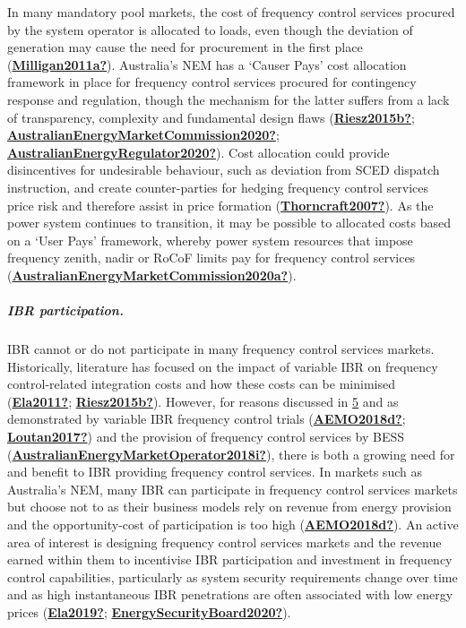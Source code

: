 \documentclass[12pt,a4paper,]{report}
\begin{document}
In many mandatory pool markets, the cost of frequency control services
procured by the system operator is allocated to loads, even though the
deviation of generation may cause the need for procurement in the first
place (\protect\hyperlink{ref-Milligan2011a}{\textbf{Milligan2011a?}}).
Australia's NEM has a `Causer Pays' cost allocation framework in place
for frequency control services procured for contingency response and
regulation, though the mechanism for the latter suffers from a lack of
transparency, complexity and fundamental design flaws
(\protect\hyperlink{ref-Riesz2015b}{\textbf{Riesz2015b?}};
\protect\hyperlink{ref-AustralianEnergyMarketCommission2020}{\textbf{AustralianEnergyMarketCommission2020?}};
\protect\hyperlink{ref-AustralianEnergyRegulator2020}{\textbf{AustralianEnergyRegulator2020?}}).
Cost allocation could provide disincentives for undesirable behaviour,
such as deviation from SCED dispatch instruction, and create
counter-parties for hedging frequency control services price risk and
therefore assist in price formation
(\protect\hyperlink{ref-Thorncraft2007}{\textbf{Thorncraft2007?}}). As
the power system continues to transition, it may be possible to
allocated costs based on a `User Pays' framework, whereby power system
resources that impose frequency zenith, nadir or RoCoF limits pay for
frequency control services
(\protect\hyperlink{ref-AustralianEnergyMarketCommission2020a}{\textbf{AustralianEnergyMarketCommission2020a?}}).

\hypertarget{ibr-participation.}{%
\subparagraph{IBR participation.}\label{ibr-participation.}}

IBR cannot or do not participate in many frequency control services
markets. Historically, literature has focused on the impact of variable
IBR on frequency control-related integration costs and how these costs
can be minimised (\protect\hyperlink{ref-Ela2011}{\textbf{Ela2011?}};
\protect\hyperlink{ref-Riesz2015b}{\textbf{Riesz2015b?}}). However, for
reasons discussed in \protect\hyperlink{sec:ibr_freq}{5} and as
demonstrated by variable IBR frequency control trials
(\protect\hyperlink{ref-AEMO2018d}{\textbf{AEMO2018d?}};
\protect\hyperlink{ref-Loutan2017}{\textbf{Loutan2017?}}) and the
provision of frequency control services by BESS
(\protect\hyperlink{ref-AustralianEnergyMarketOperator2018i}{\textbf{AustralianEnergyMarketOperator2018i?}}),
there is both a growing need for and benefit to IBR providing frequency
control services. In markets such as Australia's NEM, many IBR can
participate in frequency control services markets but choose not to as
their business models rely on revenue from energy provision and the
opportunity-cost of participation is too high
(\protect\hyperlink{ref-AEMO2018d}{\textbf{AEMO2018d?}}). An active area
of interest is designing frequency control services markets and the
revenue earned within them to incentivise IBR participation and
investment in frequency control capabilities, particularly as system
security requirements change over time and as high instantaneous IBR
penetrations are often associated with low energy prices
(\protect\hyperlink{ref-Ela2019}{\textbf{Ela2019?}};
\protect\hyperlink{ref-EnergySecurityBoard2020}{\textbf{EnergySecurityBoard2020?}}).
\end{document}
